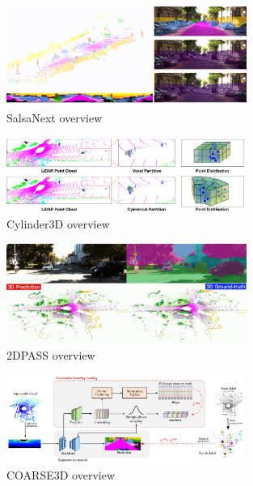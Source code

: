 \begin{figure}[htp]
  \centering
  \includegraphics[width=0.7\textwidth]{images/salsanext_overview.png}
  \caption{SalsaNext overview}
  \label{fig:salsanext-overview}
\end{figure}

\begin{figure}[htp]
  \centering
  \includegraphics[width=0.7\textwidth]{images/cylinder3d_overview.png}
  \caption{Cylinder3D overview}
  \label{fig:cylinder3d-overview}
\end{figure}

\begin{figure}[htp]
  \centering
  \includegraphics[width=0.7\textwidth]{images/2DPASS_overview.png}
  \caption{2DPASS overview}
  \label{fig:2dpass-overview}
\end{figure}

\begin{figure}[htp]
  \centering
  \includegraphics[width=0.7\textwidth]{images/coarse3d_overview.png}
  \caption{COARSE3D overview}
  \label{fig:coarse3d-overview}
\end{figure}

